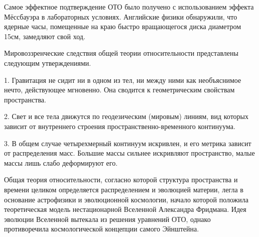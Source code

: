 \documentclass[exam_answers.tex]{subfiles}
\begin{document}
Самое эффектное подтверждение ОТО было получено с использованием
эффекта Мёссбауэра в лабораторных условиях. Английские физики
обнаружили, что ядерные часы, помещенные на краю быстро вращающегося
диска диаметром 15см, замедляют свой ход.

Мировоззренческие следствия общей теории относительности
представлены следующим утверждениями.

1. Гравитация не сидит ни в одном из тел, ни между ними как
необъяснимое нечто, действующее мгновенно. Она сводится к геометрическим
свойствам пространства.

2. Свет и все тела движутся по геодезическим (мировым) линиям, вид
которых зависит от внутреннего строения пространственно-временного
континуума.

3. В общем случае четырехмерный континуум искривлен, и его метрика
зависит от распределения масс. Большие массы сильнее искривляют
пространство, малые массы лишь слабо деформируют его.

Общая теория относительности, согласно которой структура пространства
и времени целиком определяется распределением и эволюцией материи, легла в
основание астрофизики и эволюционной космологии, начало которой положила
теоретическая модель нестационарной Вселенной Александра Фридмана.
Идея эволюции Вселенной вытекала из решения уравнений ОТО, однако
противоречила космологической концепции самого Эйнштейна.
\end{document}
